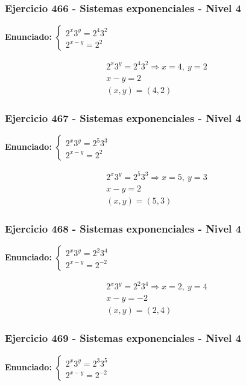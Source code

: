 \documentclass[12pt,a4paper]{article}
\begin{document}
\subsubsection*{Ejercicio 466 - Sistemas exponenciales - Nivel 4}
\textbf{Enunciado:} \(\begin{cases} 2^x3^y=2^{4}3^{2}\\ 2^{x-y}=2^{2}\end{cases}\)

\[
\begin{aligned}
2^x3^y=2^{4}3^{2}\Rightarrow x=4,\ y=2\\
x-y=2\\
\boxed{(x,y)=(4,2)}
\end{aligned}
\]


\subsubsection*{Ejercicio 467 - Sistemas exponenciales - Nivel 4}
\textbf{Enunciado:} \(\begin{cases} 2^x3^y=2^{5}3^{3}\\ 2^{x-y}=2^{2}\end{cases}\)

\[
\begin{aligned}
2^x3^y=2^{5}3^{3}\Rightarrow x=5,\ y=3\\
x-y=2\\
\boxed{(x,y)=(5,3)}
\end{aligned}
\]


\subsubsection*{Ejercicio 468 - Sistemas exponenciales - Nivel 4}
\textbf{Enunciado:} \(\begin{cases} 2^x3^y=2^{2}3^{4}\\ 2^{x-y}=2^{-2}\end{cases}\)

\[
\begin{aligned}
2^x3^y=2^{2}3^{4}\Rightarrow x=2,\ y=4\\
x-y=-2\\
\boxed{(x,y)=(2,4)}
\end{aligned}
\]


\subsubsection*{Ejercicio 469 - Sistemas exponenciales - Nivel 4}
\textbf{Enunciado:} \(\begin{cases} 2^x3^y=2^{3}3^{5}\\ 2^{x-y}=2^{-2}\end{cases}\)
\end{document}
